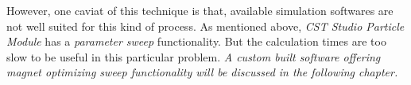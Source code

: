 \documentclass{article}
\begin{document}
However, one caviat of this technique is that, available simulation softwares are not well suited for this kind of process. As mentioned above, \textit{CST Studio Particle Module} has a \textit{parameter sweep} functionality.
But the calculation times are too slow to be useful in this particular problem. \textit{A custom built software offering magnet optimizing sweep functionality will be discussed in the following chapter.}


\end{document}
